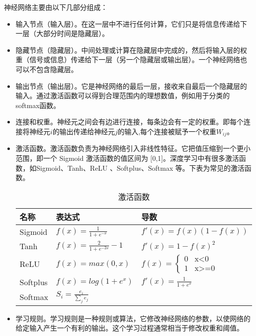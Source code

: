 神经网络主要由以下几部分组成：
\begin{itemize}
    \item 输入节点（输入层）。在这一层中不进行任何计算，它们只是将信息传递给下一层（大部分时间是隐藏层）。
    \item 隐藏节点（隐藏层）。中间处理或计算在隐藏层中完成的，然后将输入层的权重（信号或信息）传递给下一层（另一个隐藏层或输出层）。一个神经网络也可以不包含隐藏层。
    \item 输出节点（输出层）。它是神经网络的最后一层，接收来自最后一个隐藏层的输入。通过激活函数可以得到合理范围内的理想数值，例如用于分类的softmax函数。
    \item 连接和权重。神经元之间会有边进行连接，每条边会有一定的权重。即每个连接将神经元$i$的输出传递给神经元$j$的输入,每个连接被赋予一个权重$W_{ij}$。
    \item 激活函数。激活函数负责为神经网络引入非线性特征。它把值压缩到一个更小范围，即一个 Sigmoid 激活函数的值区间为 [0,1]。深度学习中有很多激活函数，如Sigmoid、Tanh、ReLU 、Softplus、Softmax 等。下表为常见的激活函数。
    \begin{table}[]
        \caption{激活函数}
        \centering
        \begin{tabular}{|l|l|l|}
        \hline
        名称&表达式&导数\\ \hline
        Sigmoid &  $f(x) = \frac{1}{1+e^{-x}}$ & $f'(x) = f(x)(1-f(x))$
        \\ \hline
        Tanh & $f(x) = \frac{2}{1+e^{-2x}} - 1$ & $f'(x) = 1 - f(x)^2$ \\ \hline
        ReLU & $f(x) = max(0, x)$ & $f(x)=\begin{cases}
        0& \text{x<0}\\
        1& \text{x>=0}
        \end{cases}$ \\ \hline
        Softplus & $f(x) = log(1+e^x)$ & $f'(x) = \frac{1}{1+e^x}$ \\ \hline
        Softmax & $S_i = \frac{e_i}{\sum_j e_j}$ & \\ \hline
        \end{tabular}
        \end{table}
    \item 学习规则。学习规则是一种规则或算法，它修改神经网络的参数，以使网络的给定输入产生一个有利的输出。这个学习过程通常相当于修改权重和阈值。
\end{itemize}

